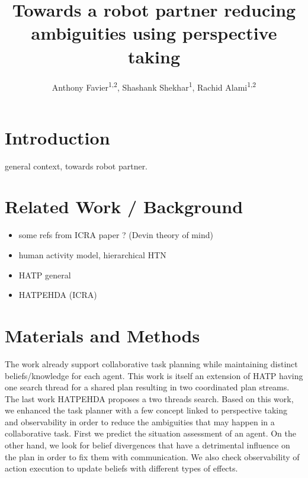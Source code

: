 \documentclass[letterpaper]{article} %
\title{Towards a robot partner reducing\\ ambiguities using perspective taking}
\author{
    Anthony Favier\textsuperscript{\rm 1,2},
    Shashank Shekhar\textsuperscript{\rm 1},
    Rachid Alami\textsuperscript{\rm 1,2}
}
\begin{document}


\maketitle

\begin{abstract}
\end{abstract}

\section{Introduction}
general context, towards robot partner. 


\clearpage
\section{Related Work / Background}

\begin{itemize}
    \item some refs from ICRA paper ? (Devin theory of mind) 
    \item human activity model, hierarchical HTN
    \item HATP general
    \item HATPEHDA (ICRA)
\end{itemize}

\section{Materials and Methods}

The work \cite{buisan:hal-03684211} already support collaborative task planning while maintaining distinct beliefs/knowledge for each agent. This work is itself an extension of HATP \cite{hatp?} having one search thread for a shared plan resulting in two coordinated plan streams. The last work HATPEHDA proposes a two threads search. Based on this work, we enhanced the task planner with a few concept linked to perspective taking and observability in order to reduce the ambiguities that may happen in a collaborative task. First we predict the situation assessment of an agent. On the other hand, we look for belief divergences that have a detrimental influence on the plan in order to fix them with communication. We also check observability of action execution to update beliefs with different types of effects.
\end{document}
